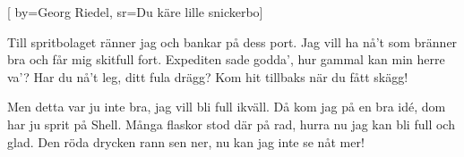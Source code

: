 [ 		
	by={Georg Riedel},					
	sr={Du käre lille snickerbo}]		
	
\beginverse*						
Till spritbolaget ränner jag och bankar på dess port. 
Jag vill ha nå't som bränner bra och får mig skitfull fort.
Expediten sade godda', hur gammal kan min herre va'?
Har du nå't leg, ditt fula drägg? Kom hit tillbaks när du fått skägg!
\endverse						

\beginverse				
Men detta var ju inte bra, jag vill bli full ikväll.
Då kom jag på en bra idé, dom har ju sprit på Shell.
Många flaskor stod där på rad, hurra nu jag kan bli full och glad.
Den röda drycken rann sen ner, nu kan jag inte se nåt mer!
\endverse				
\endsong		
